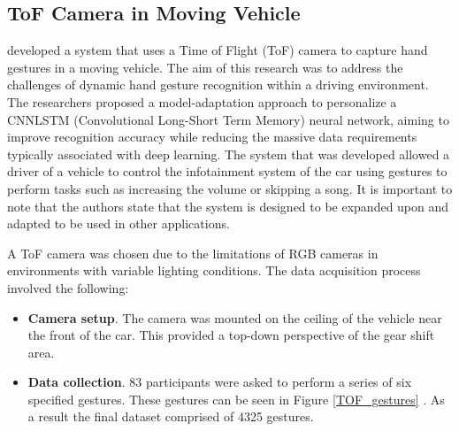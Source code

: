 \subsection{ToF Camera in Moving Vehicle}
\cite{Reyes2023} developed a system that uses a Time of Flight (ToF) camera to capture hand gestures in a moving vehicle. The aim of this research was to address the challenges of dynamic hand gesture recognition within a driving environment. The researchers proposed a model-adaptation approach to personalize a CNNLSTM (Convolutional Long-Short Term Memory) neural network, aiming to improve recognition accuracy while reducing the massive data requirements typically associated with deep learning. The system that was developed allowed a driver of a vehicle to control the infotainment system of the car using gestures to perform tasks such as increasing the volume or skipping a song. It is important to note that the authors state that the system is designed to be expanded upon and adapted to be used in other applications. 

A ToF camera was chosen due to the limitations of RGB cameras in environments with variable lighting conditions. The data acquisition process involved the following: 
 \begin{itemize}
    \item \textbf{Camera setup}. The camera was mounted on the ceiling of the vehicle near the front of the car. This provided a top-down perspective of the gear shift area. 
    \item \textbf{Data collection}. 83 participants were asked to perform a series of six specified gestures. These gestures can be seen in Figure \ref{TOF_gestures} \citep{Reyes2023}. As a result the final dataset comprised of 4325 gestures. 
 \end{itemize} 

